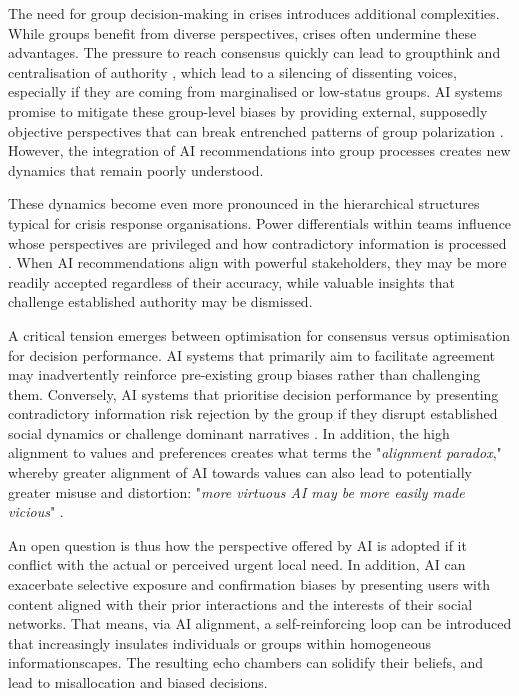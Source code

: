 \documentclass[pdflatex,sn-apa]{sn-jnl}%
\begin{document}
The need for group decision-making in crises introduces additional complexities. While groups benefit from diverse perspectives, crises often undermine these advantages. The pressure to reach consensus quickly can lead to groupthink and centralisation of authority \citep{driskell1991group}, which lead to a silencing of dissenting voices, especially if they are coming from marginalised or low-status groups. AI systems promise to mitigate these group-level biases by providing external, supposedly objective perspectives that can break entrenched patterns of group polarization \citep{jirovsky2021can}. However, the integration of AI recommendations into group processes creates new dynamics that remain poorly understood.

These dynamics become even more pronounced in the hierarchical structures typical for crisis response organisations. Power differentials within teams influence whose perspectives are privileged and how contradictory information is processed \citep{comes2024ai}. When AI recommendations align with powerful stakeholders, they may be more readily accepted regardless of their accuracy, while valuable insights that challenge established authority may be dismissed. %

A critical tension emerges between optimisation for consensus versus optimisation for decision performance. AI systems that primarily aim to facilitate agreement may inadvertently reinforce pre-existing group biases rather than challenging them. Conversely, AI systems that prioritise decision performance by presenting contradictory information risk rejection by the group if they disrupt established social dynamics or challenge dominant narratives \citep{manzini2024should}. In addition, the high alignment to values and preferences creates what \citet{west2025ai} terms the "\textit{alignment paradox}," whereby greater alignment of AI towards values can also lead to potentially greater misuse and distortion: "\textit{more virtuous AI may be more easily made vicious}" \citep{west2025ai}.

An open question is thus how the perspective offered by AI is adopted if it conflict with the actual or perceived urgent local need. In addition, AI can exacerbate selective exposure and confirmation biases by presenting users with content aligned with their prior interactions and the interests of their social networks. That means, via AI alignment, a self-reinforcing loop can be introduced that increasingly insulates individuals or groups within homogeneous informationscapes. The resulting echo chambers can solidify their beliefs, and lead to misallocation and biased decisions. 
\end{document}
